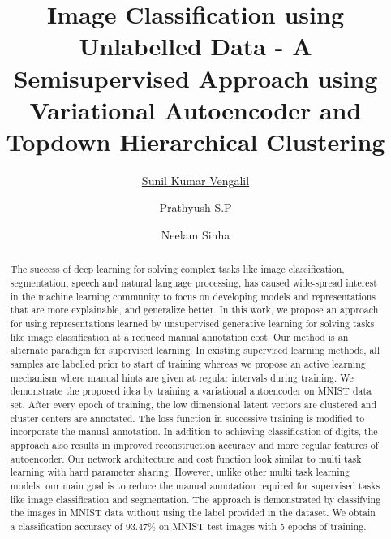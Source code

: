 \documentclass{uai2021} %
\title{Image Classification using Unlabelled Data - A Semisupervised Approach using Variational Autoencoder and Topdown Hierarchical Clustering}
\author[1]{\href{mailto:Sunil Kumar Vengalil <sunilkumar.vengalil@iiitb.org> ?Subject=Your UAI 2021 paper}{Sunil Kumar Vengalil}{}}
\author[2]{Prathyush S.P}
\author[1]{Neelam Sinha}
\affil[1]{%
    International Institute of Information Technology Bangalore\\
}
\affil[2]{%
    Worcester Polytechnic Institute \\
   100 Institute Rd, Worcester, MA 01609, United States
}
\begin{document}
\maketitle

\begin{abstract}
The success of deep learning for solving complex tasks like image classification, segmentation, speech and natural language processing, has caused wide-spread interest in the machine learning community to focus on developing models and representations that are more explainable, and generalize better.
In this work, we propose an approach for using representations learned by unsupervised generative learning for solving tasks like image classification at a reduced manual annotation cost.
Our method is an alternate paradigm for supervised learning.
In existing supervised learning methods,  all samples are labelled prior to start of training whereas we propose an active learning mechanism where manual hints are given at regular intervals during training.
We demonstrate the proposed idea by training a  variational autoencoder on MNIST data set.
After every epoch of training, the low dimensional latent vectors are clustered and cluster centers are annotated.
The loss function in successive training is modified to incorporate the manual annotation.
In addition to achieving classification of digits, the approach also results in improved reconstruction accuracy and more regular features of autoencoder.
Our network architecture and cost function look similar to multi task learning with hard parameter sharing.
However, unlike other multi task learning models, our main goal is to reduce the manual annotation required for supervised tasks like image classification and segmentation.
The approach is demonstrated by classifying the images in MNIST data without using the label provided in the dataset.
We obtain a classification accuracy of 93.47\% on MNIST test images with 5 epochs of training.
\end{abstract}
\end{document}
